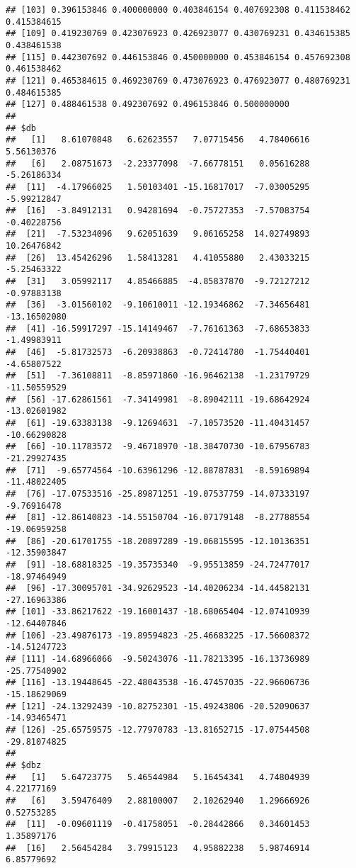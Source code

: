 \documentclass[
]{article}
\begin{document}
\begin{verbatim}
## [103] 0.396153846 0.400000000 0.403846154 0.407692308 0.411538462 0.415384615
## [109] 0.419230769 0.423076923 0.426923077 0.430769231 0.434615385 0.438461538
## [115] 0.442307692 0.446153846 0.450000000 0.453846154 0.457692308 0.461538462
## [121] 0.465384615 0.469230769 0.473076923 0.476923077 0.480769231 0.484615385
## [127] 0.488461538 0.492307692 0.496153846 0.500000000
## 
## $db
##   [1]   8.61070848   6.62623557   7.07715456   4.78406616   5.56130376
##   [6]   2.08751673  -2.23377098  -7.66778151   0.05616288  -5.26186334
##  [11]  -4.17966025   1.50103401 -15.16817017  -7.03005295  -5.99212847
##  [16]  -3.84912131   0.94281694  -0.75727353  -7.57083754  -0.40228756
##  [21]  -7.53234096   9.62051639   9.06165258  14.02749893  10.26476842
##  [26]  13.45426296   1.58413281   4.41055880   2.43033215  -5.25463322
##  [31]   3.05992117   4.85466885  -4.85837870  -9.72127212  -0.97883138
##  [36]  -3.01560102  -9.10610011 -12.19346862  -7.34656481 -13.16502080
##  [41] -16.59917297 -15.14149467  -7.76161363  -7.68653833  -1.49983911
##  [46]  -5.81732573  -6.20938863  -0.72414780  -1.75440401  -4.65807522
##  [51]  -7.36108811  -8.85971860 -16.96462138  -1.23179729 -11.50559529
##  [56] -17.62861561  -7.34149981  -8.89042111 -19.68642924 -13.02601982
##  [61] -19.63383138  -9.12694631  -7.10573520 -11.40431457 -10.66290828
##  [66] -10.11783572  -9.46718970 -18.38470730 -10.67956783 -21.29927435
##  [71]  -9.65774564 -10.63961296 -12.88787831  -8.59169894 -11.48022405
##  [76] -17.07533516 -25.89871251 -19.07537759 -14.07333197  -9.76916478
##  [81] -12.86140823 -14.55150704 -16.07179148  -8.27788554 -19.06959258
##  [86] -20.61701755 -18.20897289 -19.06815595 -12.10136351 -12.35903847
##  [91] -18.68818325 -19.35735340  -9.95513859 -24.72477017 -18.97464949
##  [96] -17.30095701 -34.92629523 -14.40206234 -14.44582131 -27.16963386
## [101] -33.86217622 -19.16001437 -18.68065404 -12.07410939 -12.64407846
## [106] -23.49876173 -19.89594823 -25.46683225 -17.56608372 -14.51247723
## [111] -14.68966066  -9.50243076 -11.78213395 -16.13736989 -25.77540902
## [116] -13.19448645 -22.48043538 -16.47457035 -22.96606736 -15.18629069
## [121] -24.13292439 -10.82752301 -15.49243806 -20.52090637 -14.93465471
## [126] -25.65759575 -12.77970783 -13.81652715 -17.07544508 -29.81074825
## 
## $dbz
##   [1]   5.64723775   5.46544984   5.16454341   4.74804939   4.22177169
##   [6]   3.59476409   2.88100007   2.10262940   1.29666926   0.52753285
##  [11]  -0.09601119  -0.41758051  -0.28442866   0.34601453   1.35897176
##  [16]   2.56454284   3.79915123   4.95882238   5.98746914   6.85779692

\end{verbatim}
\end{document}
